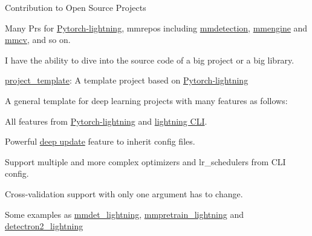 
\begin{cventries}

	\cventry
	{} %
	{Contribution to Open Source Projects} %
	{\hfill} %
	{} %
	{
		\vspace{-3.5mm}
		\begin{cvitems} %
			\item{Many Prs for \href{https://github.com/Lightning-AI/lightning}{\textcolor{link}{Pytorch-lightning}}, mmrepos including \href{https://github.com/open-mmlab/mmdetection}{\textcolor{link}{mmdetection}}, \href{https://github.com/open-mmlab/mmengine}{\textcolor{link}{mmengine}} and \href{https://github.com/open-mmlab/mmcv}{\textcolor{link}{mmcv}}, and so on.}
			\item{I have the ability to dive into the source code of a big project or a big library.}
		\end{cvitems}
	}

	\cventry
	{} %
	{\href{https://github.com/shenmishajing/project_template}{\textcolor{link}{project\_template}}: A template project based on \href{https://github.com/Lightning-AI/lightning}{\textcolor{link}{Pytorch-lightning}}} %
	{\hfill} %
	{} %
	{
		\vspace{-3.5mm}
		A general template for deep learning projects with many features as follows:
		\begin{cvitems} %
			\item{All features from \href{https://github.com/Lightning-AI/lightning}{\textcolor{link}{Pytorch-lightning}} and \href{https://pytorch-lightning.readthedocs.io/en/stable/cli/lightning_cli.html}{\textcolor{link}{lightning CLI}}.}
			\item{Powerful \href{https://github.com/shenmishajing/lightning_template/blob/main/docs/configs/deep_update.md}{\textcolor{link}{deep update}} feature to inherit config files.}
			\item{Support multiple and more complex optimizers and lr_schedulers from CLI config.}
			\item{Cross-validation support with only one argument has to change.}
		\end{cvitems}
		Some examples as \href{https://github.com/shenmishajing/mmdet_lightning}{\textcolor{link}{mmdet\_lightning}}, \href{https://github.com/shenmishajing/mmpretrain_lightning}{\textcolor{link}{mmpretrain\_lightning}} and \href{https://github.com/shenmishajing/detectron2_lightning}{\textcolor{link}{detectron2\_lightning}}
	}

\end{cventries}
